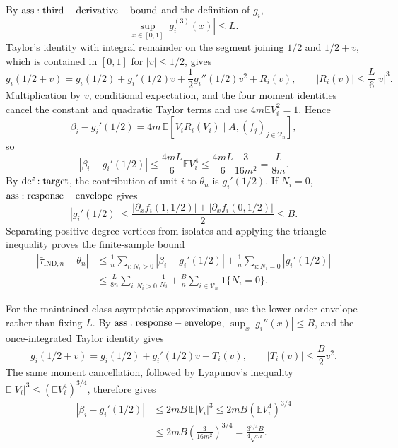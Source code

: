By \({\rm ass:third-derivative-bound}\) and the definition of \(g_i\),
\[
 \sup_{x\in[0,1]}|g_i^{(3)}(x)|\le L.
\]
Taylor's identity with integral remainder on the segment joining \(1/2\) and \(1/2+v\), which is contained in \([0,1]\) for \(|v|\le1/2\), gives
\[
 g_i(1/2+v)
 =g_i(1/2)+g_i'(1/2)v+\frac12g_i''(1/2)v^2+R_i(v),
 \qquad
 |R_i(v)|\le\frac L6|v|^3.
\]
Multiplication by \(v\), conditional expectation, and the four moment identities cancel the constant and quadratic Taylor terms and use \(4m\mathbb E V_i^2=1\).  Hence
\[
 \beta_i-g_i'(1/2)
 =4m\,\mathbb E\!\left[V_iR_i(V_i)\mid A,(f_j)_{j\in\mathcal V_n}\right],
\]
so
\[
 |\beta_i-g_i'(1/2)|
 \le\frac{4mL}{6}\mathbb E V_i^4
 \le\frac{4mL}{6}\frac3{16m^2}
 =\frac{L}{8m}.
\]
By \({\rm def:target}\), the contribution of unit \(i\) to \(\theta_n\) is \(g_i'(1/2)\).  If \(N_i=0\), \({\rm ass:response-envelope}\) gives
\[
 |g_i'(1/2)|
 \le\frac{|\partial_xf_i(1,1/2)|+|\partial_xf_i(0,1/2)|}{2}
 \le B.
\]
Separating positive-degree vertices from isolates and applying the triangle inequality proves the finite-sample bound
\[
\begin{aligned}
 |\bar\tau_{\mathrm{IND},n}-\theta_n|
 &\le\frac1n\sum_{i:N_i>0}|\beta_i-g_i'(1/2)|
 +\frac1n\sum_{i:N_i=0}|g_i'(1/2)|\\
 &\le\frac{L}{8n}\sum_{i:N_i>0}\frac1{N_i}
 +\frac Bn\sum_{i\in\mathcal V_n}\mathbf1\{N_i=0\}.
\end{aligned}
\]

For the maintained-class asymptotic approximation, use the lower-order envelope rather than fixing \(L\).  By \({\rm ass:response-envelope}\), \(\sup_x|g_i''(x)|\le B\), and the once-integrated Taylor identity gives
\[
 g_i(1/2+v)=g_i(1/2)+g_i'(1/2)v+T_i(v),
 \qquad |T_i(v)|\le\frac B2v^2.
\]
The same moment cancellation, followed by Lyapunov's inequality \(\mathbb E|V_i|^3\le(\mathbb EV_i^4)^{3/4}\), therefore gives
\[
\begin{aligned}
 |\beta_i-g_i'(1/2)|
 &\le2mB\,\mathbb E|V_i|^3
 \le2mB(\mathbb EV_i^4)^{3/4}\\
 &\le2mB\left(\frac3{16m^2}\right)^{3/4}
 =\frac{3^{3/4}B}{4\sqrt m}.
\end{aligned}
\]

